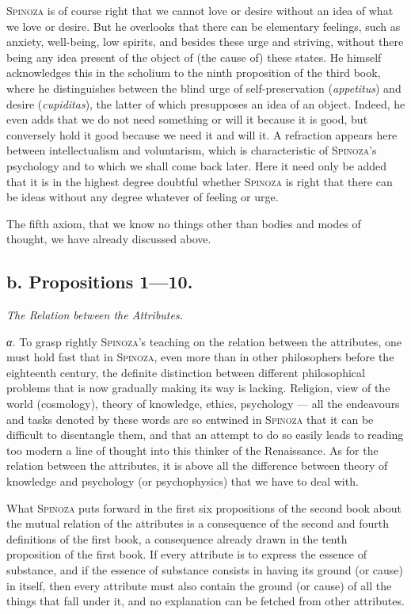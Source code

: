 \documentclass[12pt]{article}
\begin{document}
\textsc{Spinoza} is of course right that we cannot love or desire without an idea of what
we love or desire. But he overlooks that there can be elementary feelings, such as
anxiety, well-being, low spirits, and besides these urge and striving, without there being
any idea present of the object of (the cause of) these states. He himself acknowledges this
in the scholium to the ninth proposition of the third book, where he distinguishes between
the blind urge of self-preservation (\textit{appetitus}) and desire (\textit{cupiditas}),
the latter of which presupposes an idea of an object. Indeed, he even adds that we do not
need something or will it because it is good, but conversely hold it good because we need
it and will it. A refraction appears here between intellectualism and voluntarism, which is
characteristic of \textsc{Spinoza}'s psychology and to which we shall come back later.
Here it need only be added that it is in the highest degree doubtful whether
\textsc{Spinoza} is right that there can be ideas without any degree whatever of feeling or
urge.

The fifth axiom, that we know no things other than bodies and modes of thought, we have
already discussed above.

\subsection*{b. Propositions 1---10.}
\begin{center}\textit{The Relation between the Attributes.}\end{center}

\textit{α.} To grasp rightly \textsc{Spinoza}'s teaching on the relation between the
attributes, one must hold fast that in \textsc{Spinoza}, even more than in other
philosophers before the eighteenth century, the definite distinction between different
philosophical problems that is now gradually making its way is lacking. Religion, view of
the world (cosmology), theory of knowledge, ethics, psychology --- all the endeavours and
tasks denoted by these words are so entwined in \textsc{Spinoza} that it can be difficult
to disentangle them, and that an attempt to do so easily leads to reading too modern a
line of thought into this thinker of the Renaissance. As for the relation between the
attributes, it is above all the difference between theory of knowledge and psychology (or
psychophysics) that we have to deal with.

What \textsc{Spinoza} puts forward in the first six propositions of the second book about
the mutual relation of the attributes is a consequence of the second and fourth
definitions of the first book, a consequence already drawn in the tenth proposition of the
first book. If every attribute is to express the essence of substance, and if the essence
of substance consists in having its ground (or cause) in itself, then every attribute must
also contain the ground (or cause) of all the things that fall under it, and no explanation
can be fetched from other attributes.
\end{document}
